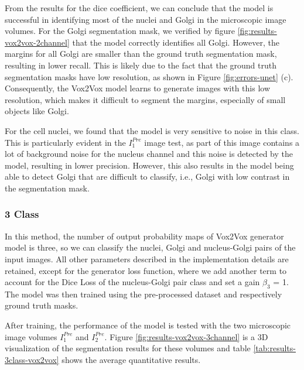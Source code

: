 From the results for the dice coefficient, we can conclude that the model is successful in identifying most of the nuclei and Golgi in the microscopic image volumes. For the Golgi segmentation mask, we verified by figure \ref{fig:results-vox2vox-2channel} that the model correctly identifies all Golgi. However, the margins for all Golgi are smaller than the ground truth segmentation mask, resulting in lower recall. This is likely due to the fact that the ground truth segmentation masks have low resolution, as shown in Figure \ref{fig:errors-unet} (c). Consequently, the Vox2Vox model learns to generate images with this low resolution, which makes it difficult to segment the margins, especially of small objects like Golgi.

For the cell nuclei, we found that the model is very sensitive to noise in this class. This is particularly evident in the $I^{Pre}_1$ image test, as part of this image contains a lot of background noise for the nucleus channel and this noise is detected by the model, resulting in lower precision. However, this also results in the model being able to detect Golgi that are difficult to classify, i.e., Golgi with low contrast in the segmentation mask.


\subsubsection*{3 Class}

In this method, the number of output probability maps of Vox2Vox generator model is three, so we can classify the nuclei, Golgi and nucleus-Golgi pairs of the input images. All other parameters described in the implementation details are retained, except for the generator loss function, where we add another term to account for the Dice Loss of the nucleus-Golgi pair class and set a gain $\beta_3$ = 1. The model was then trained using the pre-processed dataset and respectively ground truth masks.

After training, the performance of the model is tested with the two microscopic image volumes $I^{Pre}_1$ and $I^{Pre}_2$. Figure \ref{fig:results-vox2vox-3channel} is a 3D visualization of the segmentation results for these volumes and table \ref{tab:results-3class-vox2vox} shows the average quantitative results.

\begin{table}[!htb]
\centering
\caption{Average metric values obtained from testing the 3 class Vox2Vox model with two microscopic images}
\label{tab:results-3class-vox2vox}
\end{table}

